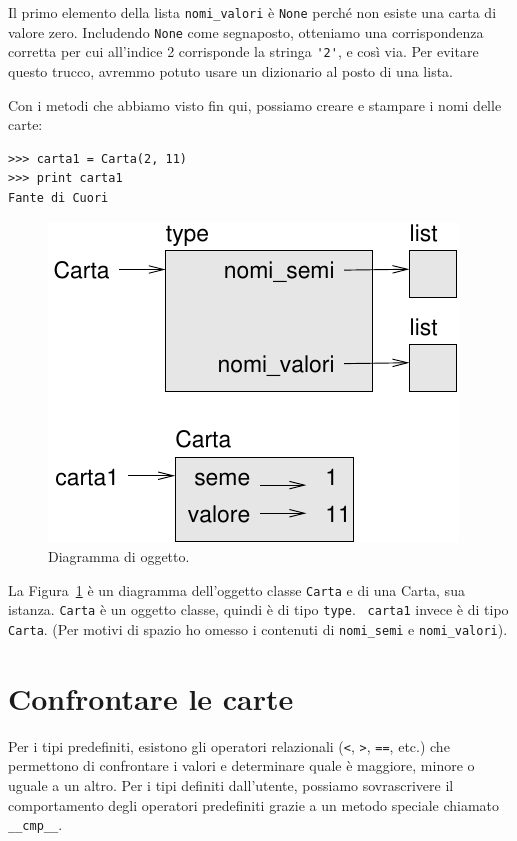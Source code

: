 \documentclass[10pt]{book}
\begin{document}
Il primo elemento della lista \verb"nomi_valori" è {\tt None} perché non esiste una carta di valore zero. Includendo {\tt None} come segnaposto, otteniamo una corrispondenza corretta per cui all'indice 2 corrisponde la stringa \verb"'2'", e così via. Per evitare questo trucco, avremmo potuto usare un dizionario al posto di una lista.

Con i metodi che abbiamo visto fin qui, possiamo creare e stampare i nomi delle carte:

\begin{verbatim}
>>> carta1 = Carta(2, 11)
>>> print carta1
Fante di Cuori
\end{verbatim}

\begin{figure}
\centerline
{\includegraphics[scale=0.8]{figs/card1.pdf}}
\caption{Diagramma di oggetto.}
\label{fig.card1}
\end{figure}

La Figura~\ref{fig.card1} è un diagramma dell'oggetto classe {\tt Carta} e di una Carta, sua istanza.
{\tt Carta} è un oggetto classe, quindi è di tipo {\tt type}.  {\tt
carta1} invece è di tipo {\tt Carta}.  (Per motivi di spazio ho omesso i contenuti di \verb"nomi_semi" e \verb"nomi_valori").


\section{Confrontare le carte}
\label{comparecard}


Per i tipi predefiniti, esistono gli operatori relazionali
({\tt <}, {\tt >}, {\tt ==}, etc.)
che permettono di confrontare i valori e determinare quale è maggiore, minore o uguale a un altro. Per i tipi definiti dall'utente, possiamo sovrascrivere il comportamento degli operatori predefiniti grazie a un metodo speciale chiamato
\verb"__cmp__".  
\end{document}
